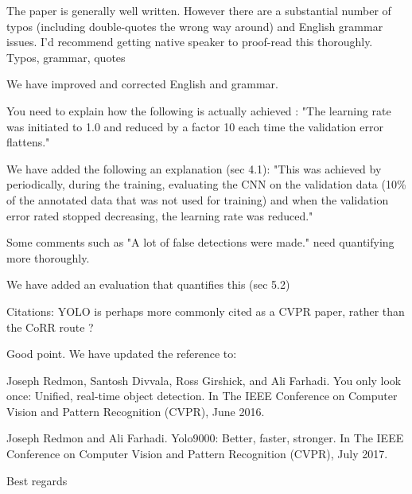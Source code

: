 \documentclass[10pt,a4paper]{letter}
\begin{document}
\begin{letter}{}
\begin{siderules}
The paper is generally well written. However there are a substantial number of typos (including double-quotes the wrong way around) and English grammar issues. I'd recommend getting
native speaker to proof-read this thoroughly. Typos, grammar, quotes
\end{siderules}

We have improved and corrected English and grammar.

\begin{siderules}
You need to explain how the following is actually achieved : "The learning rate was initiated to 1.0 and reduced by a factor 10 each time the validation 
error flattens."
\end{siderules}

We have added the following an explanation (sec 4.1): "This was achieved by periodically, during the training, evaluating the CNN on the validation data
(10\% of the annotated data that was not used for training) and when the validation error rated stopped decreasing,
the learning rate was reduced."

\begin{siderules}
Some comments such as "A lot of false detections were made." need quantifying more thoroughly.
\end{siderules}

We have added an evaluation that quantifies this (sec 5.2)

\begin{siderules}
Citations: YOLO is perhaps more commonly cited as a CVPR paper, rather than the CoRR route ?
\end{siderules}

Good point. We have updated the reference to:

Joseph Redmon, Santosh Divvala, Ross Girshick, and Ali Farhadi. You only look
once: Unified, real-time object detection. In The IEEE Conference on Computer
Vision and Pattern Recognition (CVPR), June 2016.

Joseph Redmon and Ali Farhadi. Yolo9000: Better, faster, stronger. In The IEEE
Conference on Computer Vision and Pattern Recognition (CVPR), July 2017.


 
\closing{Best regards} 
\end{letter} 
\end{document}
